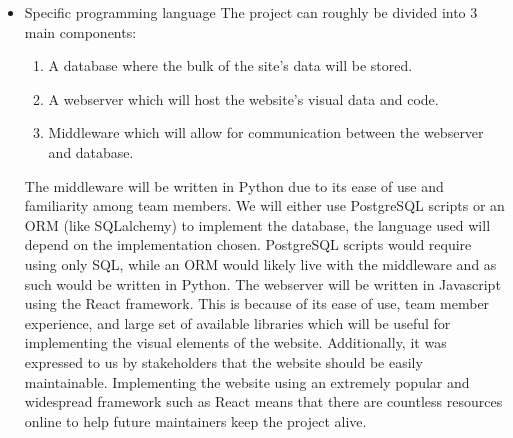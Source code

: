 \documentclass{article}
\begin{document}
\begin{itemize}
\item Specific programming language
\subitem The project can roughly be divided into 3 main components:
\begin{enumerate}
  \item A database where the bulk of the site's data will be stored.
  \item A webserver which will host the website's visual data and code.
  \item Middleware which will allow for communication between the 
  webserver and database.
\end{enumerate}
\subitem The middleware will be written in Python due to its ease of use and 
familiarity among team members.
\subitem We will either use PostgreSQL scripts or an ORM (like SQLalchemy) 
to implement the database, the language used will depend on the implementation 
chosen. PostgreSQL scripts would require using only SQL, while an ORM would 
likely live with the middleware and as such would be written in Python.
\subitem The webserver will be written in Javascript using the React framework.
This is because of its ease of use, team member experience, and large set 
of available libraries which will be useful for implementing the visual elements
of the website. Additionally, it was expressed to us by stakeholders that the 
website should be easily maintainable. Implementing the website using an 
extremely popular and widespread framework such as React means that there 
are countless resources online to help future maintainers keep the project alive.


\end{itemize}
\end{document}
